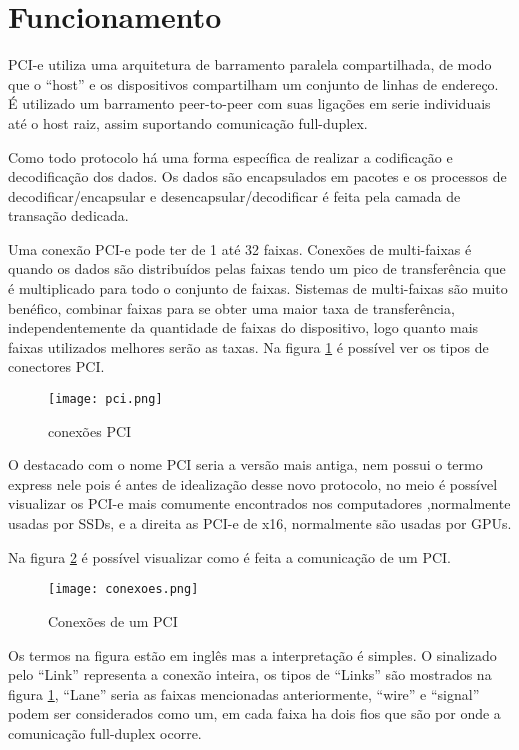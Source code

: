 \documentclass{article}
\begin{document}
    \section{Funcionamento}
        PCI-e utiliza uma arquitetura de barramento paralela compartilhada, de modo que o “host” e os dispositivos compartilham um conjunto de linhas de endereço. É utilizado um barramento peer-to-peer com suas ligações em serie individuais até o host raiz, assim suportando comunicação full-duplex.
        
        Como todo protocolo há uma forma específica de realizar a codificação e decodificação dos dados. Os dados são encapsulados em pacotes e os processos de decodificar/encapsular e desencapsular/decodificar é feita pela camada de transação dedicada.
        
        Uma conexão PCI-e pode ter de 1 até 32 faixas. Conexões de multi-faixas é quando os dados são distribuídos pelas faixas tendo um pico de transferência que é multiplicado para todo o conjunto de faixas. Sistemas de multi-faixas são muito benéfico, combinar faixas para se obter uma maior taxa de transferência, independentemente da quantidade de faixas do dispositivo, logo quanto mais faixas utilizados melhores serão as taxas. Na figura \ref{fig:PCI} é possível ver os tipos de conectores PCI.
        \begin{figure}[H]
            \centering
            \texttt{[image: pci.png]}
            \caption{conexões PCI}
            \label{fig:PCI}
        \end{figure}
        O destacado com o nome PCI seria a versão mais antiga, nem possui o termo express nele pois é antes de idealização desse novo protocolo, no meio é possível visualizar os PCI-e mais comumente encontrados nos computadores ,normalmente usadas por SSDs, e a direita as PCI-e de x16, normalmente são usadas por GPUs.
        
        Na figura \ref{fig:conexoes} é possível visualizar como é feita a comunicação de um PCI.
        \begin{figure}[H]
            \centering
            \texttt{[image: conexoes.png]}
            \caption{Conexões de um PCI}
            \label{fig:conexoes}
        \end{figure}
        Os termos na figura estão em inglês mas a interpretação é simples. O sinalizado pelo “Link” representa a conexão inteira, os tipos de “Links” são mostrados na figura \ref{fig:PCI}, “Lane” seria as faixas mencionadas anteriormente, “wire” e “signal” podem ser considerados como um, em cada faixa ha dois fios que são por onde a comunicação full-duplex ocorre.
        
\end{document}
